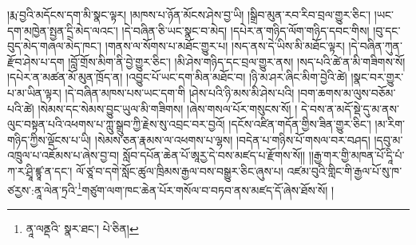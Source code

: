 །རྨ་བྱའི་མདོངས་དག་མི་སྣང་ལྟར། །མཁས་པ་ཉོན་མོངས་ཤེས་བྱ་ཡི། །སྒྲིབ་མུན་རབ་རིབ་བྲལ་གྱུར་ཅིང་། །ཡང་དག་མཁྱེན་སྤྱན་དྲི་མེད་ལའང་། །དེ་བཞིན་ཅི་ཡང་སྣང་བ་མེད། །དཔེར་ན་གཉིད་ལོག་གཉིད་དབང་གིས། །བུ་དང་བུད་མེད་གཞལ་མེད་ཁང་། །གནས་ལ་སོགས་པ་མཐོང་གྱུར་པ། །སད་ནས་དེ་ཡིས་མི་མཐོང་ལྟར། །དེ་བཞིན་ཀུན་རྫོབ་ཤེས་པ་དག །བློ་གྲོས་མིག་ནི་བྱེ་གྱུར་ཅིང་། །མི་ཤེས་གཉིད་དང་བྲལ་གྱུར་ནས། །སད་པའི་ཚེ་ན་མི་གཟིགས་སོ། །དཔེར་ན་མཚན་མོ་མུན་ཁྲོད་ན། །འབྱུང་པོ་ཡང་དག་མིན་མཐོང་བ། །ཉི་མ་ཤར་ཞིང་མིག་བྱེའི་ཚེ། །སྣང་བར་གྱུར་པ་མ་ཡིན་ལྟར། །དེ་བཞིན་མཁས་པས་ཡང་དག་གི །ཤེས་པའི་ཉི་མས་མི་ཤེས་པའི། །བག་ཆགས་མ་ལུས་བཅོམ་པའི་ཚེ། །སེམས་དང་སེམས་བྱུང་ཡུལ་མི་གཟིགས། །ཞེས་གསལ་པོར་གསུངས་སོ། །
དེ་བས་ན་མདོ་སྡེ་དུ་མ་ནས་ལུང་བསྟན་པའི་འཕགས་པ་ཀླུ་སྒྲུབ་ཀྱི་རྗེས་སུ་འབྲང་བར་བྱའོ། །དངོས་འཛིན་གདོན་གྱིས་ཟིན་གྱུར་ཅིང་། །མ་རིག་གཉིད་ཀྱིས་ལྡོངས་པ་ཡི། །སེམས་ཅན་རྣམས་ལ་འཕགས་པ་ལྷས། །བདེན་པ་གཉིས་པོ་གསལ་བར་བཤད། །དབུ་མ་འཁྲུལ་པ་འཇོམས་པ་ཞེས་བྱ་བ། སློབ་དཔོན་ཆེན་པོ་ཨཱརྱ་དེ་བས་མཛད་པ་རྫོགས་སོ།། །།རྒྱ་གར་གྱི་མཁན་པོ་དཱི་པཾ་ཀ་ར་ཤྲཱི་ཛྙཱ་ན་དང་། ལོ་ཙཱ་བ་དགེ་སློང་ཚུལ་ཁྲིམས་རྒྱལ་བས་བསྒྱུར་ཅིང་ཞུས་པ། འཛམ་བུའི་གླིང་གི་རྒྱལ་པོ་སུ་ཁ་ཙརྱས་:ནཱ་ལེན་ཏྲའི་\footnote{ནཱ་ལནྡའི་  སྣར་ཐང་།  པེ་ཅིན། }གཙུག་ལག་ཁང་ཆེན་པོར་གསོལ་བ་བཏབ་ནས་མཛད་དོ་ཞེས་ཐོས་སོ། ། 